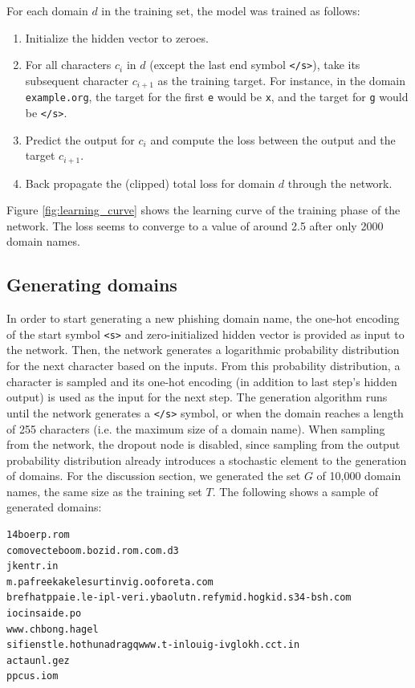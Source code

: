 For each domain $d$ in the training set, the model was trained as follows:
\begin{enumerate}
\item Initialize the hidden vector to zeroes.
\item For all characters $c_i$ in $d$ (except the last end symbol {\tt </s>}), take its subsequent character $c_{i+1}$ as the training target.
For instance, in the domain {\tt example.org}, the target for the first {\tt e} would be {\tt x}, and the target for {\tt g} would be {\tt </s>}.
\item Predict the output for $c_i$ and compute the loss between the output and the target $c_{i+1}$.
\item Back propagate the (clipped) total loss for domain $d$ through the network.
\end{enumerate}

Figure \ref{fig:learning_curve} shows the learning curve of the training phase of the network. 
The loss seems to converge to a value of around 2.5 after only 2000 domain names.

\subsection{Generating domains}
In order to start generating a new phishing domain name, the one-hot encoding of the start symbol {\tt <s>} and zero-initialized hidden vector is provided as input to the network.
Then, the network generates a logarithmic probability distribution for the next character based on the inputs.
From this probability distribution, a character is sampled and its one-hot encoding (in addition to last step's hidden output) is used as the input for the next step.
The generation algorithm runs until the network generates a {\tt </s>} symbol, or when the domain reaches a length of 255 characters (i.e. the maximum size of a domain name).
When sampling from the network, the dropout node is disabled, since sampling from the output probability distribution already introduces a stochastic element to the generation of domains.
For the discussion section, we generated the set $G$ of 10,000 domain names, the same size as the training set $T$.
The following shows a sample of generated domains:
\begin{verbatim}
14boerp.rom
comovecteboom.bozid.rom.com.d3
jkentr.in
m.pafreekakelesurtinvig.ooforeta.com
brefhatppaie.le-ipl-veri.ybaolutn.refymid.hogkid.s34-bsh.com
iocinsaide.po
www.chbong.hagel
sifienstle.hothunadragqwww.t-inlouig-ivglokh.cct.in
actaunl.gez
ppcus.iom
\end{verbatim}

